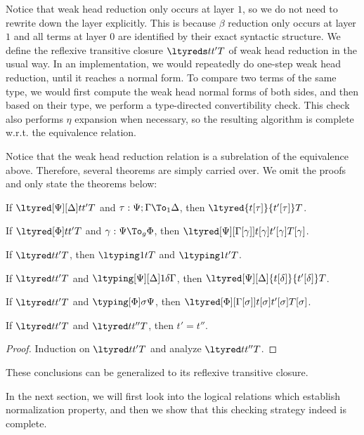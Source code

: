 Notice that weak head reduction only occurs at layer $1$, so we do not need to rewrite
down the layer explicitly. %
This is because $\beta$ reduction only occurs at layer $1$ and all terms at layer $0$
are identified by their exact syntactic structure. %
We define the reflexive transitive closure $\ltyreds t{t'} T$ of weak head reduction
in the usual way. %
In an implementation, we would repeatedly do one-step weak head reduction, until it
reaches a normal form. %
To compare two terms of the same type, we would first compute the weak head normal
forms of both sides, and then based on their type, we perform a type-directed
convertibility check. %
This check also performs $\eta$ expansion when necessary, so the resulting algorithm
is complete w.r.t. the equivalence relation. %

Notice that the weak head reduction relation is a subrelation of the equivalence
above. %
Therefore, several theorems are simply carried over. %
We omit the proofs and only state the theorems below:
\begin{lemma}
  If $\ltyred[\Psi][\Delta] t{t'} T$ and $\tau : \Psi; \Gamma \To_1 \Delta$,
    then $\ltyred {t[\tau]}{t'[\tau]} T$.
\end{lemma}

\begin{lemma}
  If $\ltyred[\Phi] t{t'} T$ and $\gamma : \Psi \To_g \Phi$,
  then $\ltyred[\Psi][\Gamma[\gamma]] {t[\gamma]}{t'[\gamma]}{T[\gamma]}$.
\end{lemma}

\begin{theorem}[Preservation]
  If $\ltyred t {t'} T$, then $\ltyping 1 t T$ and $\ltyping 1 {t'} T$. 
\end{theorem}


\begin{lemma}
  If $\ltyred t {t'} T$ and $\ltyping[\Psi][\Delta] 1 \delta \Gamma$, then
  $\ltyred[\Psi][\Delta] {t[\delta]}{t'[\delta]} T$. 
\end{lemma}
\begin{lemma}
  If $\ltyred t {t'} T$ and $\typing[\Phi]\sigma\Psi$, then
    $\ltyred[\Phi][\Gamma[\sigma]]{t[\sigma]}{t'[\sigma]}{T[\sigma]}$. 
\end{lemma}
\begin{lemma}[Uniqueness]
  If $\ltyred t {t'} T$ and $\ltyred t {t''} T$, then $t' = t''$. 
\end{lemma}
\begin{proof}
  Induction on $\ltyred t {t'} T$ and analyze $\ltyred t {t''} T$. 
\end{proof}


These conclusions can be generalized to its reflexive transitive closure. 

In the next section, we will first look into the logical relations which establish
normalization property, and then we show that this checking strategy indeed is
complete.
